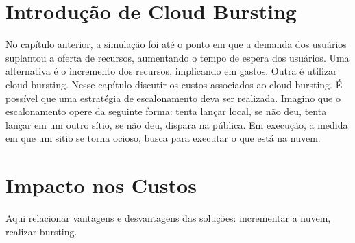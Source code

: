 \documentclass[tese,capa]{texufpel}
\begin{document}
\chapter{Introdução de Cloud Bursting}

No capítulo anterior, a simulação foi até o ponto em que a demanda dos usuários suplantou a oferta de recursos, aumentando o tempo de espera dos usuários. Uma alternativa é o incremento dos recursos, implicando em gastos. Outra é utilizar cloud bursting. Nesse capítulo discutir os custos associados ao cloud bursting. É possível que uma estratégia de escalonamento deva ser realizada. Imagino que o escalonamento opere da seguinte forma: tenta lançar local, se não deu, tenta lançar em um outro sítio, se não deu, dispara na pública. Em execução, a medida em que um sitio se torna ocioso, busca para executar o que está na nuvem.

\chapter{Impacto nos Custos}

Aqui relacionar vantagens e desvantagens das soluções: incrementar a nuvem, realizar bursting.


\end{document}
